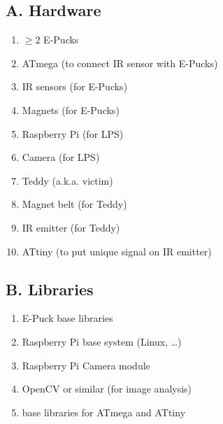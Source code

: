 \documentclass[a4paper,parskip,headheight=38pt]{scrartcl} %
\begin{document}
\subsection*{A. Hardware}
\begin{enumerate}[label=\hardware]
\item $\ge 2$ E-Pucks
\item ATmega (to connect IR sensor with E-Pucks)
\item IR sensors (for E-Pucks)
\item Magnets (for E-Pucks)
\item Raspberry Pi (for LPS)
\item Camera (for LPS)
\item Teddy (a.k.a. victim)
\item Magnet belt (for Teddy)
\item IR emitter (for Teddy)
\item ATtiny (to put unique signal on IR emitter)
\end{enumerate}

\subsection*{B. Libraries}
\begin{enumerate}[label=\libs]
\item E-Puck base libraries
\item Raspberry Pi base system (Linux, \ldots)
\item Raspberry Pi Camera module
\item OpenCV or similar (for image analysis)
\item base libraries for ATmega and ATtiny
\end{enumerate}
\end{document}
